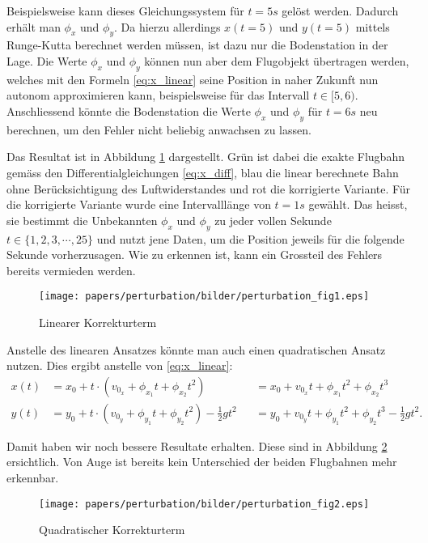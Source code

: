 Beispielsweise kann dieses Gleichungssystem für $t = 5s$ gelöst werden.
Dadurch erhält man $\phi_x$ und $\phi_y$.
Da hierzu allerdings $x(t=5)$ und $y(t=5)$ mittels Runge-Kutta berechnet werden müssen, ist dazu nur die Bodenstation in der Lage.
Die Werte $\phi_x$ und $\phi_y$ können nun aber dem Flugobjekt übertragen werden,
welches mit den Formeln \eqref{eq:x_linear} seine Position in naher Zukunft nun autonom approximieren kann,
beispielsweise für das Intervall $t \in [5,6)$.
Anschliessend könnte die Bodenstation die Werte $\phi_x$ und $\phi_y$ für $t=6s$ neu berechnen, um den Fehler nicht beliebig anwachsen zu lassen.

Das Resultat ist in Abbildung \ref{naive_linear_term} dargestellt.
Grün ist dabei die exakte Flugbahn gemäss den Differentialgleichungen \eqref{eq:x_diff},
blau die linear berechnete Bahn ohne Berücksichtigung des Luftwiderstandes und
rot die korrigierte Variante.
Für die korrigierte Variante wurde eine Intervalllänge von $t=1s$ gewählt.
Das heisst, sie bestimmt die Unbekannten $\phi_x$ und $\phi_y$ zu jeder vollen Sekunde $t \in \{1, 2, 3, \cdots, 25\}$ und nutzt jene Daten,
um die Position jeweils für die folgende Sekunde vorherzusagen.
Wie zu erkennen ist, kann ein Grossteil des Fehlers bereits vermieden werden.
\begin{figure}
    \centering
    \texttt{[image: papers/perturbation/bilder/perturbation\_fig1.eps]}
    \caption{Linearer Korrekturterm}
	\label{naive_linear_term}
\end{figure}


Anstelle des linearen Ansatzes könnte man auch einen quadratischen Ansatz nutzen.
Dies ergibt anstelle von \eqref{eq:x_linear}:
\begin{equation}
\begin{aligned}
x(t)
&=
x_0 + t \cdot (v_{0_x} + \phi_{x_1}t + \phi_{x_2}t^2)
&
&= x_0 + v_{0_x}t + \phi_{x_1}t^2 + \phi_{x_2}t^3\\
y(t)
&=
y_0 + t \cdot (v_{0_y} + \phi_{y_1}t + \phi_{y_2}t^2) - \frac{1}{2}gt^2
&
&= y_0 + v_{0_y}t + \phi_{y_1}t^2 + \phi_{y_2}t^3 - \frac{1}{2}gt^2.
\end{aligned}
\end{equation}


Damit haben wir noch bessere Resultate erhalten.
Diese sind in Abbildung \ref{naive_quadratic_term} ersichtlich.
Von Auge ist bereits kein Unterschied der beiden Flugbahnen mehr erkennbar.
\begin{figure}
    \centering
    \texttt{[image: papers/perturbation/bilder/perturbation\_fig2.eps]}
    \caption{Quadratischer Korrekturterm}
	\label{naive_quadratic_term}
\end{figure}
